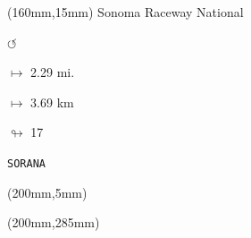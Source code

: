 \begin{textblock*}{40mm}(160mm,15mm)%
Sonoma Raceway National
\par \Huge$\circlearrowleft$
\Large
\par$\mapsto$ 2.29 mi.
\par$\mapsto$ 3.69 km
\par$\looparrowright$ 17
\par\hfill\tiny\tt SORANA\\
\end{textblock*}
\begin{textblock*}{20mm}(200mm,5mm)%
\fbox{\thepage}
\end{textblock*}
\begin{textblock*}{20mm}(200mm,285mm)%
\fbox{\thepage}
\end{textblock*}
\null\newpage

